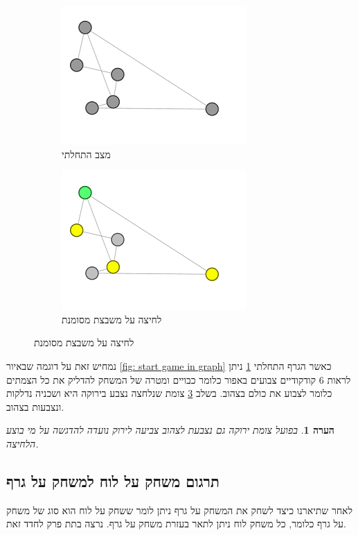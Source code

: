 \documentclass[12pt,leqno]{article}
\newtheorem{comm}{הערה}[section]
\begin{document}
\begin{figure}[ht]
    \caption{משחק על גרף לדוגמה}
    \label{fig: start game in graph}
    \begin{subfigure}{.5\textwidth}
        \centering
        \caption{מצב התחלתי}
        \label{subfig: graph game start}
        \includegraphics[scale=0.7]{images/graph_start_board.png}
    \end{subfigure}%
    \begin{subfigure}{.5\textwidth}
        \centering
        \caption{לחיצה על משבצת מסומנת}
        \label{subfig: graph game move}
        \includegraphics[scale=0.7]{images/graph_press.png}
    \end{subfigure}%
\end{figure}

נמחיש זאת על דוגמה שבאיור
\ref{fig: start game in graph}
כאשר הגרף התחלתי
\ref{subfig: graph game start}
ניתן לראות
$6$
קודקודיים
צבועים באפור כלומר כבויים ומטרה של המשחק להדליק את כל הצמתים כלומר לצבוע את כולם בצהוב.
בשלב 
\ref{subfig: graph game move}
צומת שנלחצה נצבע בירוקה היא ושכניה נדלקות ונצבעות בצהוב.

\begin{comm}
    בפועל צומת ירוקה גם נצבעת לצהוב צביעה לירוק נועדה להדגשה על מי בוצע הלחיצה.
\end{comm}

\subsection{תרגום משחק על לוח למשחק על גרף}
לאחר שתיארנו כיצד לשחק את המשחק על גרף ניתן לומר ששחק על לוח
הוא סוג של משחק על גרף
כלומר, כל משחק 
לוח ניתן לתאר בעזרת משחק על גרף.
נרצה בתת פרק לחדד זאת.
\end{document}
